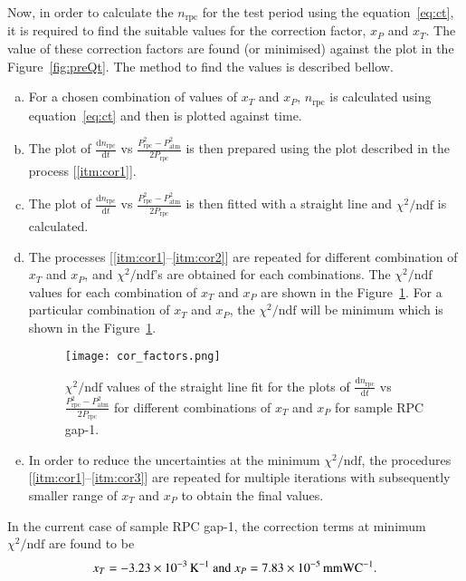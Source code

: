 Now, in order to calculate the $n_{\textrm{rpc}}$ for the test period using the equation~\ref{eq:ct}, it is required to find the suitable values for the correction factor, $x_P$ and $x_T$. The value of these correction factors are found (or minimised) against the plot in the Figure~\ref{fig:preQt}. The method to find the values is described bellow.
\begin{enumerate}[a.]
\item \label{itm:cor1} For a chosen combination of values of $x_T$ and $x_P$, $n_{\textrm{rpc}}$ is calculated using equation~\ref{eq:ct} and then is plotted against time.
\item The plot of $\frac{\mathrm{d}n_{\textrm{rpc}}}{\mathrm{d}t}$ vs $\frac{P_{\textrm{rpc}}^{2}-P_{\textrm{atm}}^{2}}{2P_{\textrm{rpc}}}$ is then prepared using the plot described in the process [\ref{itm:cor1}].
\item \label{itm:cor2} The plot of $\frac{\mathrm{d}n_{\textrm{rpc}}}{\mathrm{d}t}$ vs $\frac{P_{\textrm{rpc}}^{2}-P_{\textrm{atm}}^{2}}{2P_{\textrm{rpc}}}$ is then fitted with a straight line and $\chi^2/\textrm{ndf}$ is calculated.
\item \label{itm:cor3} The processes [\ref{itm:cor1}--\ref{itm:cor2}] are repeated for different combination of $x_T$ and $x_P$, and  $\chi^2/\textrm{ndf}$'s are obtained for each combinations. The $\chi^2/\textrm{ndf}$ values for each combination of $x_T$ and $x_P$ are shown in the Figure~\ref{fig:xp}. For a particular combination of $x_T$ and $x_P$, the $\chi^2/\textrm{ndf}$ will be minimum which is shown in the Figure~\ref{fig:xp}.
  \begin{figure}[h]
    \centering
    \texttt{[image: cor\_factors.png]}
    \caption{$\chi^2/\textrm{ndf}$ values of the straight line fit for the plots of $\frac{\mathrm{d}n_{\textrm{rpc}}}{\mathrm{d}t}$ vs $\frac{P_{\textrm{rpc}}^{2}-P_{\textrm{atm}}^{2}}{2P_{\textrm{rpc}}}$ for different combinations of $x_T$ and $x_P$ for sample RPC gap-1.}
    \label{fig:xp}
  \end{figure}
\item  In order to reduce the uncertainties at the minimum $\chi^2/\textrm{ndf}$, the procedures [\ref{itm:cor1}--\ref{itm:cor3}] are repeated for multiple iterations with subsequently smaller range of $x_T$ and $x_P$ to obtain the final values. 
\end{enumerate}

 In the current case of sample RPC gap-1, the correction terms at minimum $\chi^2/\textrm{ndf}$ are found to be 
\[x_T=-3.23\times10^{-3}\textrm{\,K}^{-1}\textrm{ and }x_P=7.83\times10^{-5}\textrm{\,mmWC}^{-1}\textrm{.}\]

